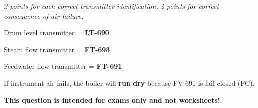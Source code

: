 
{\it 2 points for each correct transmitter identification, 4 points for correct consequence of air failure.}

\vskip 10pt

Drum level transmitter = {\bf LT-690}

\vskip 10pt

Steam flow transmitter = {\bf FT-693}

\vskip 10pt

Feedwater flow transmitter = {\bf FT-691}

\vskip 10pt

If instrument air fails, the boiler will {\bf run dry} because FV-691 is fail-closed (FC).








{\bf This question is intended for exams only and not worksheets!}.


